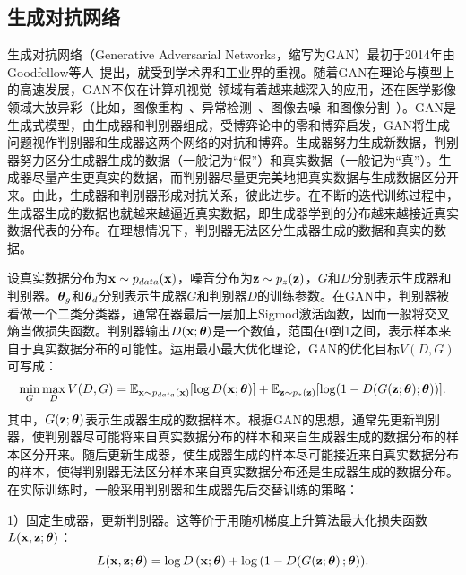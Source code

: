 \subsection{生成对抗网络}\label{subsec:gan_introduction}
生成对抗网络（Generative Adversarial Networks，缩写为GAN）最初于2014年由Goodfellow等人~\cite{goodfellow2014generative}提出，就受到学术界和工业界的重视。随着GAN在理论与模型上的高速发展，GAN不仅在计算机视觉~\cite{zhu2017unpaired}领域有着越来越深入的应用，还在医学影像领域大放异彩（比如，图像重构~\cite{bhadra2020medical}、异常检测~\cite{Kohl2017AdversarialNF}、图像去噪~\cite{Yang2018LowDoseCI}和图像分割~\cite{Han2018SpineGANSS}）。GAN是生成式模型，由生成器和判别器组成，受博弈论中的零和博弈启发，GAN将生成问题视作判别器和生成器这两个网络的对抗和博弈。生成器努力生成新数据，判别器努力区分生成器生成的数据（一般记为“假”）和真实数据（一般记为“真”）。生成器尽量产生更真实的数据，而判别器尽量更完美地把真实数据与生成数据区分开来。由此，生成器和判别器形成对抗关系，彼此进步。在不断的迭代训练过程中，生成器生成的数据也就越来越逼近真实数据，即生成器学到的分布越来越接近真实数据代表的分布。在理想情况下，判别器无法区分生成器生成的数据和真实的数据。

设真实数据分布为$\mathbf{x}\sim p_{{data}}(\mathbf{x})$，噪音分布为$\mathbf{z}\sim p_{{z}}(\mathbf{z})$，$G$和$D$分别表示生成器和判别器。$\mbox{\boldmath $\theta$}_{g}$和$\mbox{\boldmath $\theta$}_{d}$分别表示生成器$G$和判别器$D$的训练参数。在GAN中，判别器被看做一个二类分类器，通常在器最后一层加上Sigmod激活函数，因而一般将交叉熵当做损失函数。判别器输出$D(\mathbf{x};\mbox{\boldmath $\theta$})$是一个数值，范围在0到1之间，表示样本来自于真实数据分布的可能性。运用最小最大优化理论，GAN的优化目标$V(D, G)$可写成：
\begin{eqnarray}\label{equ:gan_loss_func}
\min _{G} \max _{D} V(D, G)=\mathbb{E}_{ \mathbf{x} \sim {p}_{ {data }}(\mathbf{x})}[\log D(\mathbf{x};\mbox{\boldmath $\theta$})]+\mathbb{E}_{\mathbf{z} \sim {p}_{{z}}(\mathbf{z})}[\log (1-D(G(\mathbf{z};\mbox{\boldmath $\theta$});\mbox{\boldmath $\theta$}))].
\end{eqnarray}
\noindent 其中，$G(\mathbf{z};\mbox{\boldmath $\theta$})$表示生成器生成的数据样本。根据GAN的思想，通常先更新判别器，使判别器尽可能将来自真实数据分布的样本和来自生成器生成的数据分布的样本区分开来。随后更新生成器，使生成器生成的样本尽可能接近来自真实数据分布的样本，使得判别器无法区分样本来自真实数据分布还是生成器生成的数据分布。在实际训练时，一般采用判别器和生成器先后交替训练的策略：

1）固定生成器，更新判别器。这等价于用随机梯度上升算法最大化损失函数$L(\mathbf{x},\mathbf{z};\mbox{\boldmath $\theta$})$：
\begin{equation}
L(\mathbf{x},\mathbf{z};\mbox{\boldmath $\theta$})=\log D\left(\mathbf{x};\mbox{\boldmath $\theta$}\right)+\log \left(1-D(G(\mathbf{z};\mbox{\boldmath $\theta$}\right);\mbox{\boldmath $\theta$})).
\end{equation}
	
